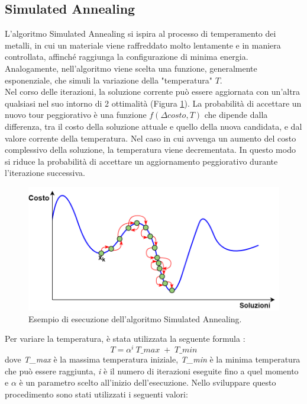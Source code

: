 \subsection{Simulated Annealing}
L'algoritmo Simulated Annealing si ispira al processo di temperamento dei metalli, in cui un materiale viene raffreddato molto lentamente e in maniera controllata, affinché raggiunga la configurazione di minima energia\cite{SA}. Analogamente, nell'algoritmo viene scelta una funzione, generalmente esponenziale, che simuli la variazione della "temperatura" $T$.\\
Nel corso delle iterazioni, la soluzione corrente può essere aggiornata con un'altra qualsiasi nel suo intorno di 2 ottimalità (Figura \ref{simulated_annealing}). La probabilità di accettare un nuovo tour peggiorativo è una funzione $f(\Delta costo, T)$ che dipende dalla differenza, tra il costo della soluzione attuale e quello della nuova candidata, e dal valore corrente della temperatura. Nel caso in cui avvenga un aumento del costo complessivo della soluzione, la temperatura viene decrementata. In questo modo si riduce la probabilità di accettare un aggiornamento peggiorativo durante l'iterazione successiva. \\
 \begin{figure}[H]
\begin{center} 
  \includegraphics[scale=0.38]{Images/simulated_anneling}
  \caption{\footnotesize{Esempio di esecuzione dell'algoritmo Simulated Annealing.}}
  \label{simulated_annealing}
\end{center}
\end{figure}
Per variare la temperatura, è stata utilizzata la seguente formula \cite{SA}:
$$T = \alpha^{i}\:T\_max \;+\; T\_min$$
dove \textit{T\_max} è la massima temperatura iniziale, \textit{T\_min} è la minima temperatura che può essere raggiunta, \textit{i} è il numero di iterazioni eseguite fino a quel momento e \textit{$\alpha$} è un parametro scelto all'inizio dell'esecuzione. Nello sviluppare questo procedimento sono stati utilizzati i seguenti valori:
